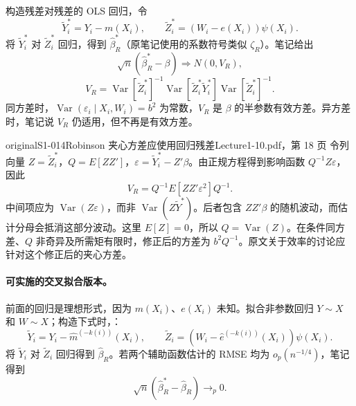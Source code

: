 构造残差对残差的 OLS 回归，令
\[
\widetilde Y_i^*=Y_i-m(X_i),\qquad
\widetilde Z_i^*=(W_i-e(X_i))\psi(X_i).
\]
将 $\widetilde Y_i^*$ 对 $\widetilde Z_i^*$ 回归，得到 $\widehat\beta_R^*$（原笔记使用的系数符号类似 $\zeta_R$）。笔记给出
\[
\sqrt n(\widehat\beta_R^*-\beta)\Rightarrow N(0,V_R),
\]
\[
V_R=\operatorname{Var}[\widetilde Z_i^*]^{-1}
\operatorname{Var}[\widetilde Z_i^*\widetilde Y_i^*]
\operatorname{Var}[\widetilde Z_i^*]^{-1}.
\]
同方差时，$\operatorname{Var}(\varepsilon_i\mid X_i,W_i)=b^2$ 为常数，$V_R$ 是 $\beta$ 的半参数有效方差。异方差时，笔记说 $V_R$ 仍适用，但不再是有效方差。
\begin{reviewnote}{original}{S1-014}{Robinson 夹心方差应使用回归残差}{Lecture1-10.pdf，第 18 页}
令列向量 $Z=\widetilde Z_i^*$，$Q=E[ZZ']$，$\varepsilon=\widetilde Y_i^*-Z'\beta$。由正规方程得到影响函数 $Q^{-1}Z\varepsilon$，因此
\[
V_R=Q^{-1}E[ZZ'\varepsilon^2]Q^{-1}.
\]
中间项应为 $\operatorname{Var}(Z\varepsilon)$，而非 $\operatorname{Var}(Z\widetilde Y^*)$。后者包含 $ZZ'\beta$ 的随机波动，而估计分母会抵消这部分波动。这里 $E[Z]=0$，所以 $Q=\operatorname{Var}(Z)$。在条件同方差、$Q$ 非奇异及所需矩有限时，修正后的方差为 $b^2Q^{-1}$。原文关于效率的讨论应针对这个修正后的夹心方差。
\end{reviewnote}


\paragraph{可实施的交叉拟合版本。}
前面的回归是理想形式，因为 $m(X_i)$、$e(X_i)$ 未知。拟合非参数回归 $Y\sim X$ 和 $W\sim X$；构造下式时，：
\[
\widetilde Y_i=Y_i-\widehat m^{(-k(i))}(X_i),\qquad
\widetilde Z_i=(W_i-\widehat e^{(-k(i))}(X_i))\psi(X_i).
\]
将 $\widetilde Y_i$ 对 $\widetilde Z_i$ 回归得到 $\widehat\beta_R$。若两个辅助函数估计的 RMSE 均为 $o_p(n^{-1/4})$，笔记得到
\[
\sqrt n(\widehat\beta_R^*-\widehat\beta_R)\longrightarrow_p0.
\]
